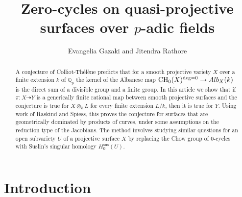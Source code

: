 \documentclass[12pt]{amsart}
\theoremstyle{remark}
\newcommand{\Q}{{\mathbb Q}}
\renewcommand{\1}{{\mathbb{S}}}
\newcommand{\CH}{{\rm CH}}
\newcommand{\<}{\langle}
\renewcommand{\>}{\rangle}
\newcommand{\Sus}{{\operatorname{sus}}}
\begin{document}
	\title{Zero-cycles on quasi-projective surfaces over $p$-adic fields}
		\author{Evangelia Gazaki and Jitendra Rathore}
		\address{Department of Mathematics, University of Virginia, 221 Kerchof Hall, 141 Cabell Dr., Charlottesville,
			VA, 22904, USA.}
		\address{Department of Mathematics, South Hall, Room 6607, University of California Santa Barbara, CA, 93106-3080, USA.}


	
	
	

	
	
	\maketitle

\begin{abstract} A conjecture of Colliot-Th\'{e}l\`{e}ne predicts that for a smooth projective variety $X$ over a finite extension $k$ of  $\Q_p$ the kernel of the Albanese map $\CH_0(X)^{\deg=0}\to Alb_X(k)$ is the direct sum of a divisible group and a finite group. In this article we show that if $\pi:X\dashrightarrow Y$ is a generically finite rational map between smooth projective surfaces and the conjecture is true for $X\otimes_k L$ for every finite extension $L/k$, then it is true for $Y$. Using work of Raskind and Spiess, this proves the conjecture for surfaces that are geometrically dominated by products of curves, under some assumptions on the reduction type of the Jacobians. The method involves studying  similar questions for an open subvariety $U$ of a projective surface $X$ by replacing the Chow group of $0$-cycles  with Suslin's singular homology $H_0^\Sus(U)$. 
\end{abstract}
	
	
	\setcounter{tocdepth}{1}
	
	\tableofcontents
	
	
	
	
	
	
	
	\section{Introduction}
	
\end{document}
